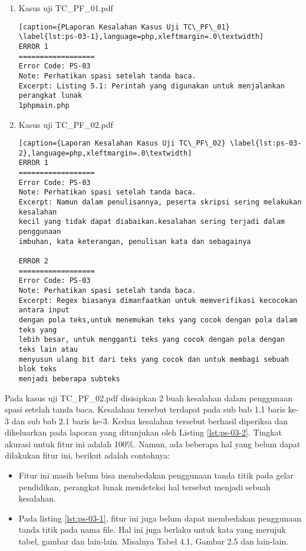 \begin{enumerate}
	\item Kasus uji TC\_PF\_01.pdf
	
\begin{lstlisting}[caption={PLaporan Kesalahan Kasus Uji TC\_PF\_01}	\label{lst:ps-03-1},language=php,xleftmargin=.0\textwidth]
ERROR 1
==================
Error Code: PS-03
Note: Perhatikan spasi setelah tanda baca.
Excerpt: Listing 5.1: Perintah yang digunakan untuk menjalankan perangkat lunak
1phpmain.php
\end{lstlisting}
	
	\item Kasus uji TC\_PF\_02.pdf
	
\begin{lstlisting}[caption={Laporan Kesalahan Kasus Uji TC\_PF\_02}	\label{lst:ps-03-2},language=php,xleftmargin=.0\textwidth]
ERROR 1
==================
Error Code: PS-03
Note: Perhatikan spasi setelah tanda baca.
Excerpt: Namun dalam penulisannya, peserta skripsi sering melakukan kesalahan 
kecil yang tidak dapat diabaikan.kesalahan sering terjadi dalam penggunaan 
imbuhan, kata keterangan, penulisan kata dan sebagainya

ERROR 2
==================
Error Code: PS-03
Note: Perhatikan spasi setelah tanda baca.
Excerpt: Regex biasanya dimanfaatkan untuk memverifikasi kecocokan antara input 
dengan pola teks,untuk menemukan teks yang cocok dengan pola dalam teks yang 
lebih besar, untuk mengganti teks yang cocok dengan pola dengan teks lain atau 
menyusun ulang bit dari teks yang cocok dan untuk membagi sebuah blok teks 
menjadi beberapa subteks
\end{lstlisting}
\end{enumerate}

Pada kasus uji TC\_PF\_02.pdf disisipkan 2 buah kesalahan dalam penggunaan spasi setelah tanda baca. Kesalahan tersebut terdapat pada sub bab 1.1 baris ke-3 dan sub bab 2.1 baris ke-3. Kedua kesalahan tersebut berhasil diperiksa dan dikeluarkan pada laporan yang ditunjukan oleh Listing \ref{lst:ps-03-2}. Tingkat akurasi untuk fitur ini adalah 100\%. Namun, ada beberapa hal yang belum dapat dilakukan fitur ini, berikut adalah contohnya:

\begin{itemize}
	\item Fitur ini masih belum bisa membedakan penggunaan tanda titik pada gelar pendidikan, perangkat lunak mendeteksi hal tersebut menjadi sebuah kesalahan.
	
	\item Pada listing \ref{lst:ps-03-1}, fitur ini juga belum dapat membedakan penggunaan tanda titik pada nama file. Hal ini juga berlaku untuk kata yang merujuk tabel, gambar dan lain-lain. Misalnya Tabel 4.1, Gambar 2.5 dan lain-lain.
\end{itemize}

